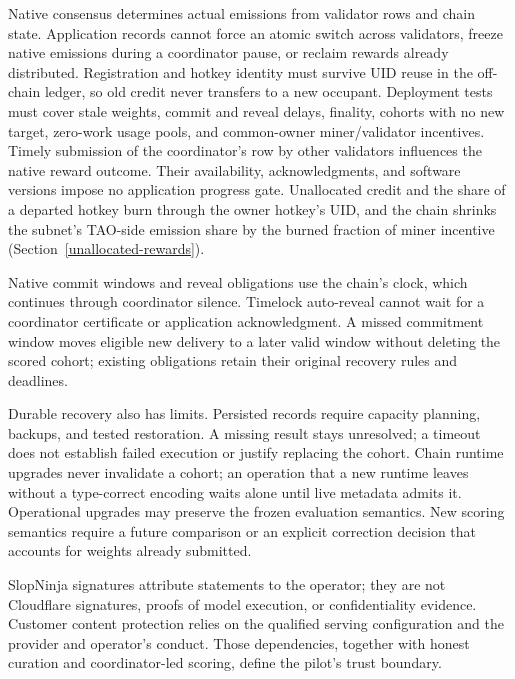 Native consensus determines actual emissions from validator rows and chain
state. Application records cannot force an atomic switch across validators,
freeze native emissions during a coordinator pause, or reclaim rewards already
distributed. Registration and hotkey identity must survive UID reuse in the
off-chain ledger, so old credit never transfers to a new occupant. Deployment tests must cover stale weights, commit and reveal delays,
finality, cohorts with no new target, zero-work usage pools, and common-owner miner/validator incentives. Timely
submission of the coordinator's row by other validators influences the
native reward outcome. Their availability, acknowledgments, and
software versions impose no application progress gate. Unallocated credit and
the share of a departed hotkey burn through the owner hotkey's UID, and the
chain shrinks the subnet's TAO-side emission share by the burned fraction of
miner incentive (Section~\ref{unallocated-rewards}).

Native commit windows and reveal obligations use the chain's clock, which
continues through coordinator silence. Timelock auto-reveal cannot wait for a
coordinator certificate or application acknowledgment. A missed commitment window
moves eligible new delivery to a later valid window without deleting the scored
cohort; existing obligations retain their original recovery rules and deadlines.

Durable recovery also has limits. Persisted records require capacity planning,
backups, and tested restoration. A missing result stays unresolved; a timeout
does not establish failed execution or justify replacing the cohort. Chain
runtime upgrades never invalidate a cohort; an operation that a new runtime
leaves without a type-correct encoding waits alone until live metadata admits
it. Operational upgrades may preserve the frozen evaluation semantics. New
scoring semantics require a future comparison or an explicit
correction decision that accounts for weights already submitted.

SlopNinja signatures attribute statements to the operator; they are not
Cloudflare signatures, proofs of model execution, or confidentiality evidence.
Customer content protection relies on the qualified serving configuration and
the provider and operator's conduct. Those dependencies, together with honest
curation and coordinator-led scoring, define the pilot's trust boundary.
